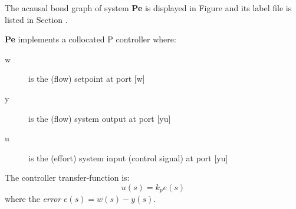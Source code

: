 

   The acausal bond graph of system \textbf{Pe} is
   displayed in Figure  and its label
   file is listed in Section .

\textbf{Pe} implements a collocated P controller where:
\begin{description}
\item[w] is the (flow) setpoint at port [w]
\item[y] is the (flow) system output at port [yu]
\item[u] is the (effort) system input (control signal) at port [yu]
\end{description}

The controller transfer-function is:
\begin{equation}
  u(s) = k_p e(s) 
\end{equation}
where the \emph{error} $e(s) = w(s) - y(s)$.